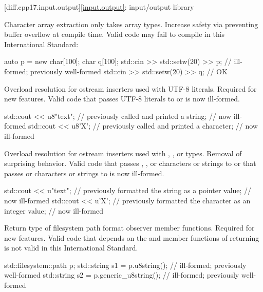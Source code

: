[diff.cpp17.input.output]{\ref{input.output}: input/output library}

\change
Character array extraction only takes array types.
\rationale
Increase safety via preventing buffer overflow at compile time.
\effect
Valid \CppXVII{} code may fail to compile in this International Standard:
\begin{codeblock}
auto p = new char[100];
char q[100];
std::cin >> std::setw(20) >> p;         // ill-formed; previously well-formed
std::cin >> std::setw(20) >> q;         // OK
\end{codeblock}

\change
Overload resolution for ostream inserters used with UTF-8 literals.
\rationale
Required for new features.
\effect
Valid \CppXVII{} code that passes UTF-8 literals to
 or
 is now ill-formed.
\begin{codeblock}
std::cout << u8"text";          // previously called  and printed a string;
                                // now ill-formed
std::cout << u8'X';             // previously called  and printed a character;
                                // now ill-formed
\end{codeblock}

\change
Overload resolution for ostream inserters
used with , , or  types.
\rationale
Removal of surprising behavior.
\effect
Valid \CppXVII{} code that passes
, , or  characters or strings
to  or
that passes  or  characters or strings
to  is now ill-formed.
\begin{codeblock}
std::cout << u"text";           // previously formatted the string as a pointer value;
                                // now ill-formed
std::cout << u'X';              // previously formatted the character as an integer value;
                                // now ill-formed
\end{codeblock}

\change
Return type of filesystem path format observer member functions.
\rationale
Required for new features.
\effect
Valid \CppXVII{} code that depends on the  and
 member functions of 
returning  is not valid in this International Standard.
\begin{codeblock}
std::filesystem::path p;
std::string s1 = p.u8string();          // ill-formed; previously well-formed
std::string s2 = p.generic_u8string();  // ill-formed; previously well-formed
\end{codeblock}

